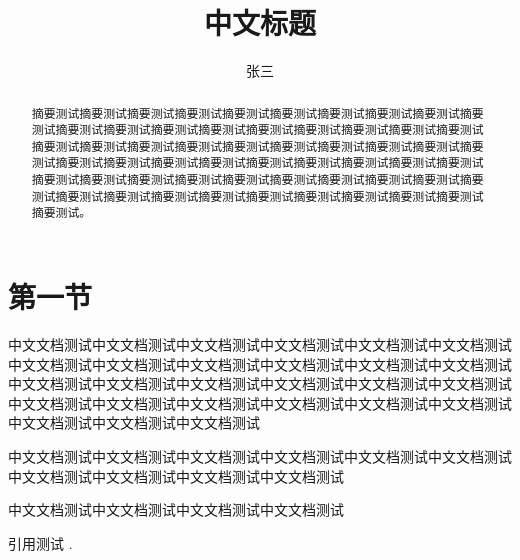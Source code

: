 \documentclass{article}
\title{中文标题}
\author{张三}
\begin{document}
\maketitle
\begin{abstract}
	摘要测试摘要测试摘要测试摘要测试摘要测试摘要测试摘要测试摘要测试摘要测试摘要测试摘要测试摘要测试摘要测试摘要测试摘要测试摘要测试摘要测试摘要测试摘要测试摘要测试摘要测试摘要测试摘要测试摘要测试摘要测试摘要测试摘要测试摘要测试摘要测试摘要测试摘要测试摘要测试摘要测试摘要测试摘要测试摘要测试摘要测试摘要测试摘要测试摘要测试摘要测试摘要测试摘要测试摘要测试摘要测试摘要测试摘要测试摘要测试摘要测试摘要测试摘要测试摘要测试摘要测试摘要测试摘要测试摘要测试摘要测试摘要测试。
\end{abstract}


\section{第一节}

中文文档测试中文文档测试中文文档测试中文文档测试中文文档测试中文文档测试中文文档测试中文文档测试中文文档测试中文文档测试中文文档测试中文文档测试中文文档测试中文文档测试中文文档测试中文文档测试中文文档测试中文文档测试中文文档测试中文文档测试中文文档测试中文文档测试中文文档测试中文文档测试中文文档测试中文文档测试中文文档测试

中文文档测试中文文档测试中文文档测试中文文档测试中文文档测试中文文档测试中文文档测试中文文档测试中文文档测试中文文档测试

中文文档测试中文文档测试中文文档测试中文文档测试

引用测试 \cite{Silver2016Mastering,Mnih2015Human,pmlr-v48-mniha16}.





\end{document}
